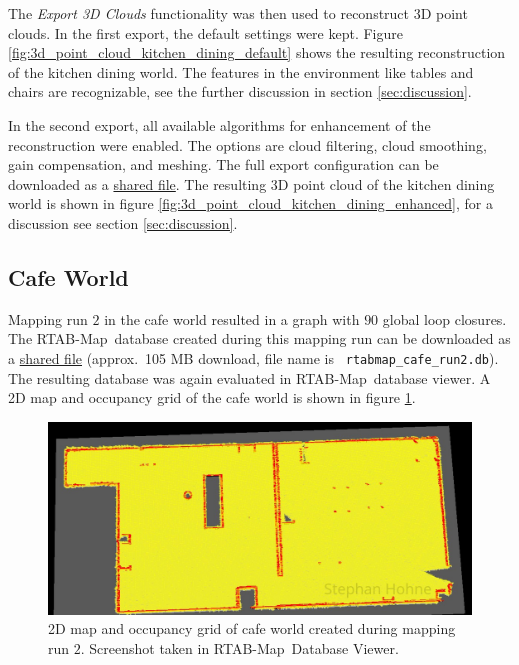 \documentclass[10pt, journal, compsoc]{IEEEtran}
\newcommand{\rtab}{RTAB-Map}
\begin{document}
The \emph{Export 3D Clouds} functionality was then used to reconstruct 3D point clouds. In the first export, the default settings were kept. Figure \ref{fig:3d_point_cloud_kitchen_dining_default} shows the resulting reconstruction of the kitchen dining world. The features in the environment like tables and chairs are recognizable, see the further discussion in section \ref{sec:discussion}.

In the second export, all available algorithms for enhancement of the reconstruction were enabled. The options are cloud filtering, cloud smoothing, gain compensation, and meshing. The full export configuration can be downloaded as a \href{https://drive.google.com/open?id=1bmjYFEaccEG5NGRl02-8-JeOp9Mh6Myq}{shared file}. The resulting 3D point cloud of the kitchen dining world is shown in figure \ref{fig:3d_point_cloud_kitchen_dining_enhanced}, for a discussion see section \ref{sec:discussion}.

\subsection{Cafe World}
Mapping run $2$ in the cafe world resulted in a graph with $90$ global loop closures. The \rtab\ database created during this mapping run can be downloaded as a \href{https://drive.google.com/file/d/1fHX3h5c7w3LujcECYeHjkJM_bD-jZVOq/view?usp=sharing}{shared file} (approx.\ 105 MB download, file name is \texttt{
rtabmap\_cafe\_run2.db}). The resulting database was again evaluated in \rtab\ database  viewer. A 2D map and occupancy grid of the cafe world is shown in figure \ref{fig:rtabmap_occupancy_grid_cafe}.
\begin{figure}[htbp]
      \centering
      \includegraphics[width=\columnwidth]{images/rtabmap_occupancy_grid_cafe.jpg}
      \caption{2D map and occupancy grid of cafe world created during mapping run $2$. Screenshot taken in \rtab\ Database Viewer.}
      \label{fig:rtabmap_occupancy_grid_cafe}
\end{figure}
\end{document}
